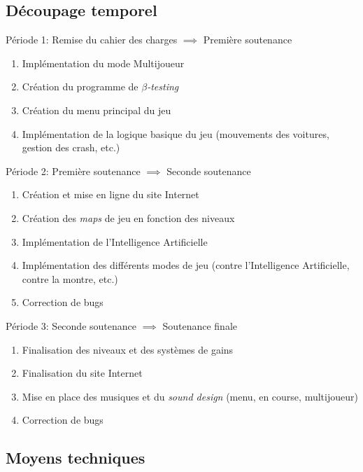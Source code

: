 \documentclass[11pt,a4paper]{article}
\newcommand{\AI}{Intelligence Artificielle}
\begin{document}
  \subsection{Découpage temporel}
    \begin{description}
      \item Période 1: Remise du cahier des charges \(\implies\) Première soutenance
        \begin{enumerate}
          \item Implémentation du mode Multijoueur
          \item Création du programme de \(\beta\)\textit{-testing}
          \item Création du menu principal du jeu
          \item Implémentation de la logique basique du jeu (mouvements des voitures, gestion des crash, etc.)
        \end{enumerate}
      \item Période 2: Première soutenance \(\implies\) Seconde soutenance
        \begin{enumerate}
          \item Création et mise en ligne du site Internet
          \item Création des \textit{maps} de jeu en fonction des niveaux
          \item Implémentation de l'\AI
          \item Implémentation des différents modes de jeu (contre l'\AI, contre la montre, etc.)
          \item Correction de bugs
        \end{enumerate}
      \item Période 3: Seconde soutenance \(\implies\) Soutenance finale
        \begin{enumerate}
          \item Finalisation des niveaux et des systèmes de gains
          \item Finalisation du site Internet
          \item Mise en place des musiques et du \textit{sound design} (menu, en course, multijoueur)
          \item Correction de bugs
        \end{enumerate}
    \end{description}
  \clearpage

  \subsection{Moyens techniques}
\end{document}
